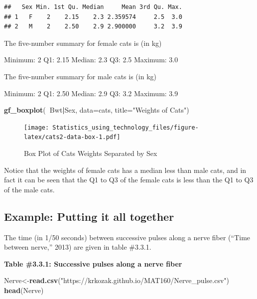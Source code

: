 \documentclass[]{book}
\newenvironment{Shaded}{\begin{snugshade}}{\end{snugshade}}
\newcommand{\DataTypeTok}[1]{\textcolor[rgb]{0.13,0.29,0.53}{#1}}
\newcommand{\KeywordTok}[1]{\textcolor[rgb]{0.13,0.29,0.53}{\textbf{#1}}}
\newcommand{\NormalTok}[1]{#1}
\newcommand{\OperatorTok}[1]{\textcolor[rgb]{0.81,0.36,0.00}{\textbf{#1}}}
\newcommand{\StringTok}[1]{\textcolor[rgb]{0.31,0.60,0.02}{#1}}
\begin{document}
\begin{verbatim}
##   Sex Min. 1st Qu. Median     Mean 3rd Qu. Max.
## 1   F    2    2.15    2.3 2.359574     2.5  3.0
## 2   M    2    2.50    2.9 2.900000     3.2  3.9
\end{verbatim}

The five-number summary for female cats is (in kg)

Minimum: 2
Q1: 2.15
Median: 2.3
Q3: 2.5
Maximum: 3.0

The five-number summary for male cats is (in kg)

Minimum: 2
Q1: 2.50
Median: 2.9
Q3: 3.2
Maximum: 3.9



\begin{Shaded}
\begin{Highlighting}[]
\KeywordTok{gf_boxplot}\NormalTok{(}\OperatorTok{~}\NormalTok{Bwt}\OperatorTok{|}\NormalTok{Sex, }\DataTypeTok{data=}\NormalTok{cats, }\DataTypeTok{title=}\StringTok{"Weights of Cats"}\NormalTok{)}
\end{Highlighting}
\end{Shaded}

\begin{figure}
\centering
\texttt{[image: Statistics\_using\_technology\_files/figure-latex/cats2-data-box-1.pdf]}
\caption{\label{fig:cats2-data-box}Box Plot of Cats Weights Separated by Sex}
\end{figure}

Notice that the weights of female cats has a median less than male cats, and in fact it can be seen that the Q1 to Q3 of the female cats is less than the Q1 to Q3 of the male cats.

\hypertarget{example-putting-it-all-together}{%
\subsection{Example: Putting it all together}\label{example-putting-it-all-together}}

The time (in 1/50 seconds) between successive pulses along a nerve fiber (``Time
between nerve,'' 2013) are given in table \#3.3.1.

\textbf{Table \#3.3.1: Successive pulses along a nerve fiber}

\begin{Shaded}
\begin{Highlighting}[]
\NormalTok{Nerve<-}\KeywordTok{read.csv}\NormalTok{(}\StringTok{"https://krkozak.github.io/MAT160/Nerve_pulse.csv"}\NormalTok{)}
\KeywordTok{head}\NormalTok{(Nerve)}
\end{Highlighting}
\end{Shaded}
\end{document}
